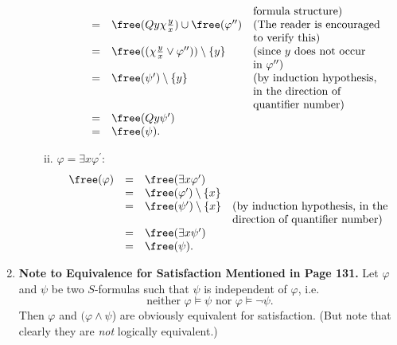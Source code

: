 \begin{enumerate}[1.]
\begin{enumerate}[(1)]
\begin{enumerate}[(i)]
\[\begin{array}{llll}
\              & \ & \                                                 & \mbox{formula structure)} \\
\              & = & \free(Qy \chi\frac{y}{x}) \cup \free(\varphi^{\prime\prime}) & \mbox{(The reader is encouraged} \\
\              & \ & \ & \mbox{to verify this)} \\
\              & = & \free((\chi\frac{y}{x} \lor \varphi^{\prime\prime})) \setminus \{ y \} & \mbox{(since $y$ does not occur} \\
\              & \ & \ & \mbox{in $\varphi^{\prime\prime}$)} \\
\              & = & \free(\psi^\prime) \setminus \{ y \} & \mbox{(by induction hypothesis,} \\
\              & \ & \ & \mbox{in the direction of} \\
\              & \ & \ & \mbox{quantifier number)} \\
\              & = & \free(Qy \psi^\prime) & \ \\
\              & = & \free(\psi). & \ 
\end{array}
\]
\item $\varphi = \exists x \varphi^\prime$:
\[
\begin{array}{llll}
\free(\varphi) & = & \free(\exists x \varphi^\prime) & \ \\
\              & = & \free(\varphi^\prime) \setminus \{ x \} & \ \\
\              & = & \free(\psi^\prime) \setminus \{ x \} & \mbox{(by induction hypothesis, in the} \\
\              & \ & \ & \mbox{direction of quantifier number)} \\
\              & = & \free(\exists x \psi^\prime) & \ \\
\              & = & \free(\psi). & \ 
\end{array}
\]
\end{enumerate}
\end{enumerate}
\item \textbf{Note to Equivalence for Satisfaction Mentioned in Page 131.} Let $\varphi$ and $\psi$ be two $S$-formulas such that $\psi$ is independent of $\varphi$, i.e.
\[
\mbox{neither $\varphi \models \psi$ nor $\varphi \models \neg \psi$}.
\]
Then $\varphi$ and $(\varphi \land \psi$) are obviously equivalent for satisfaction. (But note that clearly they are \emph{not} logically equivalent.)\\
\\

\end{enumerate}
